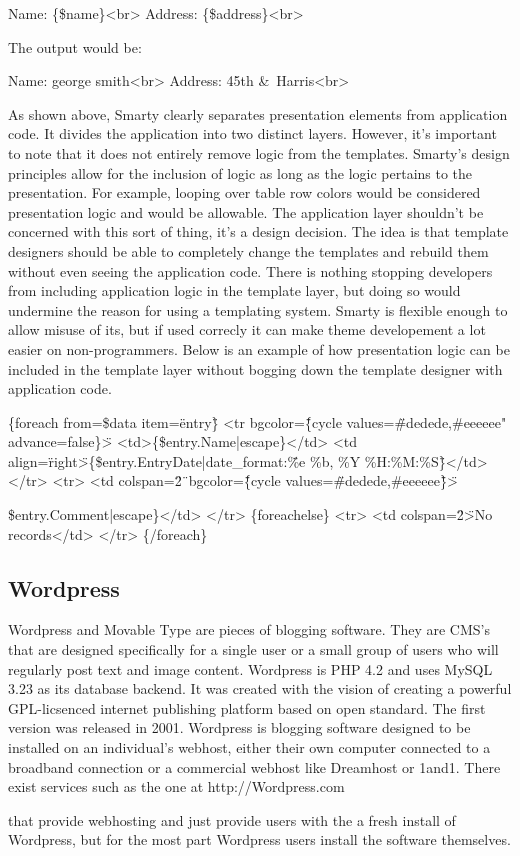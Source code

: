 \documentclass[a4paper,12pt]{report}
\begin{document}
Name: \{\$name\}<br>
Address: \{\$address\}<br>

The output would be:

Name: george smith<br>
Address: 45th \&\ Harris<br>

As shown above, Smarty clearly separates presentation elements from application code. 
It divides the application into two distinct layers. 
However, it's important to note that it does not entirely remove logic from the templates. 
Smarty's design principles allow for the inclusion of logic as long as the logic pertains to the presentation. 
For example, looping over table row colors would be considered presentation logic and would be allowable. 
The application layer shouldn't be concerned with this sort of thing, it's a design decision. 
The idea is that template designers should be able to completely change the templates and rebuild them without even seeing the application code.
There is nothing stopping developers from including application logic in the template layer, but doing so would undermine the reason for using a templating system. 
Smarty is flexible enough to allow misuse of its, but if used correcly it can make theme developement a lot easier on non-programmers. 
Below is an example of how presentation logic can be included in the template layer without bogging down the template designer with application code. 

    \{foreach from=\$data item=\"entry\"\}
        <tr bgcolor=\"\{cycle values=\"\#dedede,\#eeeeee" advance=false\}\">
            <td>\{\$entry.Name|escape\}</td>        
            <td align=\"right\">\{\$entry.EntryDate|date\_format:\"\%e \%b, \%Y \%H:\%M:\%S\"\}</td>        
        </tr>
        <tr>
            <td colspan=\"2\"\ bgcolor=\"\{cycle values=\"\#dedede,\#eeeeee\"\}\">{\$entry.Comment|escape\}</td>
        </tr>
    \{foreachelse\}
        <tr>
            <td colspan=\"2\">No records</td>
        </tr>
    \{/foreach\}


\subsection {Wordpress}
Wordpress and Movable Type are pieces of blogging software. 
They are CMS's that are designed specifically for a single user or a small group of users who will regularly post text and image content. 
Wordpress is PHP 4.2 and uses MySQL 3.23 as its database backend. 
It was created with the vision of creating a powerful GPL-licsenced internet publishing platform based on open standard. 
The first version was released in 2001. 
Wordpress is blogging software designed to be installed on an individual's webhost, either their own computer connected to a broadband connection or a commercial webhost like Dreamhost or 1and1. There exist services such as the one at http://Wordpress.com} that provide webhosting and just provide users with the a fresh install of Wordpress, but for the most part Wordpress users install the software themselves. 
\end{document}
